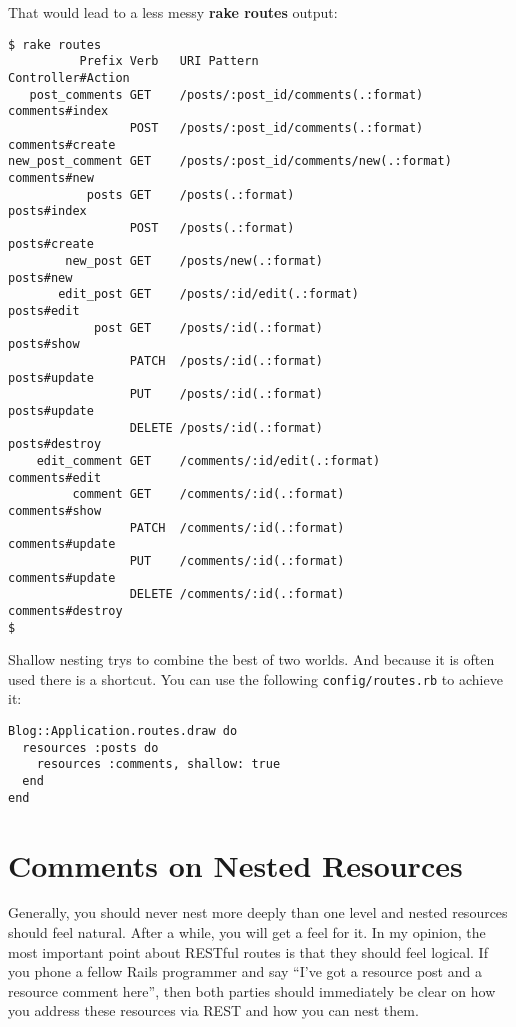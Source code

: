 \documentclass[a4paper]{book}
\begin{document}
That would lead to a less messy \textbf{rake routes} output:

\begin{shaded}\begin{verbatim}
$ rake routes
          Prefix Verb   URI Pattern                            Controller#Action
   post_comments GET    /posts/:post_id/comments(.:format)     comments#index
                 POST   /posts/:post_id/comments(.:format)     comments#create
new_post_comment GET    /posts/:post_id/comments/new(.:format) comments#new
           posts GET    /posts(.:format)                       posts#index
                 POST   /posts(.:format)                       posts#create
        new_post GET    /posts/new(.:format)                   posts#new
       edit_post GET    /posts/:id/edit(.:format)              posts#edit
            post GET    /posts/:id(.:format)                   posts#show
                 PATCH  /posts/:id(.:format)                   posts#update
                 PUT    /posts/:id(.:format)                   posts#update
                 DELETE /posts/:id(.:format)                   posts#destroy
    edit_comment GET    /comments/:id/edit(.:format)           comments#edit
         comment GET    /comments/:id(.:format)                comments#show
                 PATCH  /comments/:id(.:format)                comments#update
                 PUT    /comments/:id(.:format)                comments#update
                 DELETE /comments/:id(.:format)                comments#destroy
$
\end{verbatim}\end{shaded}

Shallow nesting trys to combine the best of two worlds. And because it is often used there is a shortcut. You can use the following \texttt{config/routes.rb} to achieve it:

\begin{shaded}\begin{verbatim}
Blog::Application.routes.draw do
  resources :posts do
    resources :comments, shallow: true
  end
end
\end{verbatim}\end{shaded}

\section{Comments on Nested Resources}\label{comments-on-nested-resources}

Generally, you should never nest more deeply than one level and nested resources should feel natural. After a while, you will get a feel for it. In my opinion, the most important point about RESTful routes is that they should feel logical. If you phone a fellow Rails programmer and say “I've got a resource post and a resource comment here”, then both parties should immediately be clear on how you address these resources via REST and how you can nest them.
\end{document}

